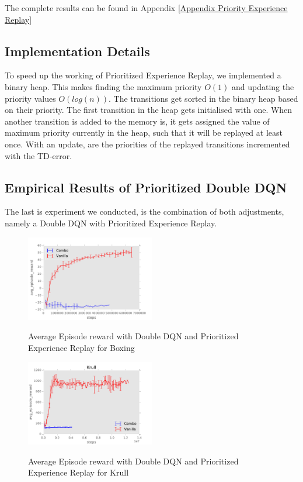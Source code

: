 \documentclass{sig-alternate}
\begin{document}
The complete results can be found in Appendix \ref{Appendix Priority Experience Replay}

\subsection{Implementation Details}

To speed up the working of Prioritized Experience Replay, we implemented a binary heap. This makes finding the maximum priority $O(1)$ and updating the priority values $O(log(n))$. The transitions get sorted in the binary heap based on their priority. The first transition in the heap gets initialised with one. When another transition is added to the memory is, it gets assigned the value of maximum priority currently in the heap, such that it will be replayed at least once. With an update, are the priorities of the replayed transitions incremented with the TD-error.


\subsection{Empirical Results of Prioritized Double DQN}

The last is experiment we conducted, is the combination of both adjustments, namely a Double DQN with Prioritized Experience Replay. 

\begin{figure}[h!]
    \centering
    \includegraphics[width=0.5\textwidth]{../results/Boxing/Comparisons/Combo/Combo-baseline-avg_episode_reward.pdf}
    \label{boxing Double DQN}
    \caption{Average Episode reward with Double DQN and Prioritized Experience Replay for Boxing}
\end{figure}

\begin{figure}[h!]
    \centering
    \includegraphics[width=0.5\textwidth]{../results/Krull/Comparisons/Combo/Combo-baseline-avg_episode_reward.pdf}
    \label{krull Double DQN}
    \caption{Average Episode reward with Double DQN and Prioritized Experience Replay for Krull}
\end{figure}
\end{document}
